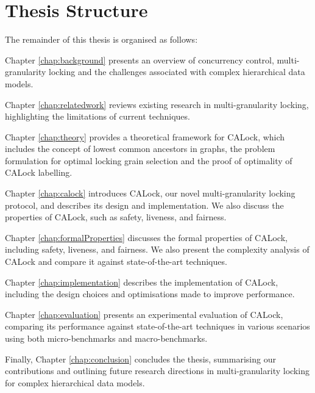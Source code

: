 \section*{Thesis Structure}
The remainder of this thesis is organised as follows:

 Chapter \ref{chap:background} presents an overview of concurrency control, multi-granularity locking and the challenges associated with complex hierarchical data models. 

 Chapter \ref{chap:relatedwork} reviews existing research in multi-granularity locking, highlighting the limitations of current techniques. 

 Chapter \ref{chap:theory} provides a theoretical framework for CALock, which includes the concept of lowest common ancestors in graphs, the problem formulation for optimal locking grain selection and the proof of optimality of CALock labelling.

 Chapter \ref{chap:calock} introduces CALock, our novel multi-granularity locking protocol, and describes its design and implementation. We also discuss the properties of CALock, such as safety, liveness, and fairness.

Chapter \ref{chap:formalProperties} discusses the formal properties of CALock, including safety, liveness, and fairness. We also present the complexity analysis of CALock and compare it against state-of-the-art techniques.

 Chapter \ref{chap:implementation} describes the implementation of CALock, including the design choices and optimisations made to improve performance.
 
 Chapter \ref{chap:evaluation} presents an experimental evaluation of CALock, comparing its performance against state-of-the-art techniques in various scenarios using both micro-benchmarks and macro-benchmarks.
 
 Finally, Chapter \ref{chap:conclusion} concludes the thesis, summarising our contributions and outlining future research directions in multi-granularity locking for complex hierarchical data models.
